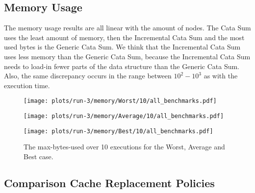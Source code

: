 \newpage
\subsection{Memory Usage}

The memory usage results are all linear with the amount of nodes. The Cata Sum uses the least amount of memory, then the Incremental Cata Sum and the most used bytes is the Generic Cata Sum. We think that the Incremental Cata Sum uses less memory than the Generic Cata Sum, because the Incremental Cata Sum needs to load-in fewer parts of the data structure than the Generic Cata Sum. Also, the same discrepancy occurs in the range between $10^2 - 10^3$ as with the execution time.

\begin{figure}[H]
  \begin{minipage}{.5\textwidth}
    \centering
    \texttt{[image: plots/run-3/memory/Worst/10/all\_benchmarks.pdf]}  
  \end{minipage}
  \begin{minipage}{.5\textwidth}
    \centering
    \texttt{[image: plots/run-3/memory/Average/10/all\_benchmarks.pdf]}  
  \end{minipage}
  \begin{center}
    \begin{minipage}[c]{.5\textwidth}
      \centering
      \texttt{[image: plots/run-3/memory/Best/10/all\_benchmarks.pdf]}  
    \end{minipage}
  \end{center}
  \caption{The max-bytes-used over 10 executions for the Worst, Average and Best case.}
\end{figure}

\newpage
\subsection{Comparison Cache Replacement Policies}